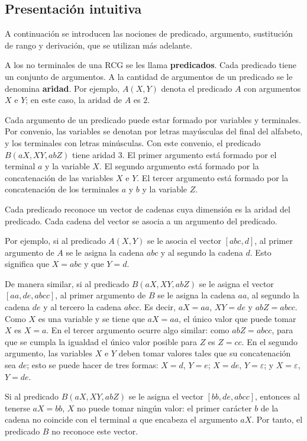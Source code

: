 \documentclass{report}
\theoremstyle{definition}
\theoremstyle{plain}
\theoremstyle{remark}
\begin{document}
\subsection{Presentación intuitiva}

A continuación se introducen las nociones de predicado, argumento,
sustitución de rango y derivación, que se utilizan más adelante.

A los no terminales de una RCG se les llama \textbf{predicados}. Cada
predicado tiene un conjunto de argumentos. A la cantidad de argumentos
de un predicado se le denomina \textbf{aridad}. Por ejemplo, $A(X, Y)$
denota el predicado $A$ con argumentos $X$ e $Y$; en este caso, la
aridad de $A$ es $2$.

Cada argumento de un predicado puede estar formado por variables y
terminales. Por convenio, las variables se denotan por letras mayúsculas
del final del alfabeto, y los terminales con letras minúsculas. Con este
convenio, el predicado $B(aX, XY, abZ)$ tiene aridad $3$. El primer
argumento está formado por el terminal $a$ y la variable $X$. El
segundo argumento está formado por la concatenación de las variables
$X$ e $Y$. El tercer argumento está formado por la concatenación de los
terminales $a$ y $b$ y la variable $Z$.

Cada predicado reconoce un vector de cadenas cuya dimensión es la
aridad del predicado. Cada cadena del vector se asocia a un argumento
del predicado.

Por ejemplo, si al predicado $A(X, Y)$ se le asocia el vector $[abc,
d]$, al primer argumento de $A$ se le asigna la cadena $abc$ y al
segundo la cadena $d$. Esto significa que $X = abc$ y que $Y = d$.

De manera similar, si al predicado $B(aX, XY, abZ)$ se le asigna el
vector $[aa, de, abcc]$, al primer argumento de $B$ se le asigna la
cadena $aa$, al segundo la cadena $de$ y al tercero la cadena $abcc$.
Es decir, $aX = aa$, $XY = de$ y $abZ = abcc$. Como $X$ es una variable
y se tiene que $aX = aa$, el único valor que puede tomar $X$ es $X = a$.
En el tercer argumento ocurre algo similar: como $abZ = abcc$, para que
se cumpla la igualdad el único valor posible para $Z$ es $Z = cc$. En el
segundo argumento, las variables $X$ e $Y$ deben tomar valores tales que
su concatenación sea $de$; esto se puede hacer de tres formas:
$X = d$, $Y = e$; $X = de$, $Y = \varepsilon$; y $X = \varepsilon$,
$Y = de$.

Si al predicado $B(aX, XY, abZ)$ se le asigna el vector
$[bb, de, abcc]$, entonces al tenerse $aX = bb$, $X$ no puede tomar
ningún valor: el primer carácter $b$ de la cadena no coincide con el
terminal $a$ que encabeza el argumento $aX$. Por tanto, el predicado
$B$ no reconoce este vector.
\end{document}
